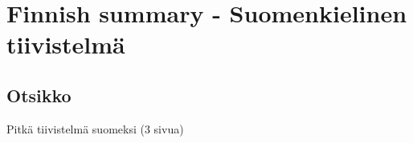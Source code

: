 \section{Finnish summary - Suomenkielinen tiivistelmä}

\clearpage

\setcounter{subsection}{-1}
\let\oldsubsection=\thesubsection
\renewcommand{\thesubsection}{\thesection}

\subsection{Otsikko}

Pitkä tiivistelmä suomeksi (3 sivua)

\renewcommand{\thesubsection}{\oldsubsection}

